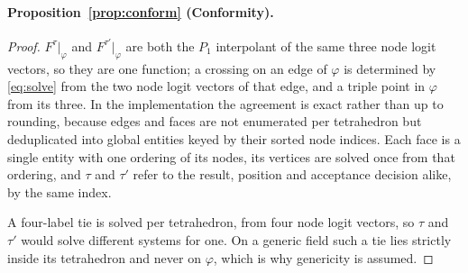 \documentclass[11pt]{article}
\theoremstyle{definition}
\newcommand{\tet}{\tau}
\newcommand{\interp}{F}
\begin{document}
\paragraph*{Proposition~\ref{prop:conform} (Conformity).}
\begin{proof}
$\interp^\tet|_\varphi$ and $\interp^{\tet'}|_\varphi$ are both the $P_1$
interpolant of the same three node logit vectors, so they are one function;
a crossing on an edge of $\varphi$ is determined by \eqref{eq:solve} from the
two node logit vectors of that edge, and a triple point in $\varphi$ from its
three. In the implementation the agreement is exact rather than up to
rounding, because edges and faces are not enumerated per tetrahedron but
deduplicated into global entities keyed by their sorted node indices. Each
face is a single entity with one ordering of its nodes, its vertices are
solved once from that ordering, and $\tet$ and $\tet'$ refer to the result,
position and acceptance decision alike, by the same index.

A four-label tie is solved per tetrahedron, from four node logit vectors, so
$\tet$ and $\tet'$ would solve different systems for one. On a generic field
such a tie lies strictly inside its tetrahedron and never on $\varphi$, which
is why genericity is assumed.
\end{proof}
\end{document}
